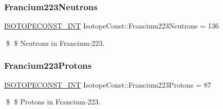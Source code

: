 \subsubsection{\texorpdfstring{Francium223\+Neutrons}{Francium223Neutrons}}
{\footnotesize\ttfamily \mbox{\hyperlink{group___isotope_const-_macros_ga5f18360b3e99483a35c32d789e62621c}{I\+S\+O\+T\+O\+P\+E\+C\+O\+N\+S\+T\+\_\+\+I\+NT}} Isotope\+Const\+::\+Francium223\+Neutrons = 136}

\$ \$ Neutrons in Francium-\/223. \mbox{\label{group___isotope_const-_francium-_fr223_gae2969e4bd4cb16bd9b59349f22cb2c62}} 
\subsubsection{\texorpdfstring{Francium223\+Protons}{Francium223Protons}}
{\footnotesize\ttfamily \mbox{\hyperlink{group___isotope_const-_macros_ga5f18360b3e99483a35c32d789e62621c}{I\+S\+O\+T\+O\+P\+E\+C\+O\+N\+S\+T\+\_\+\+I\+NT}} Isotope\+Const\+::\+Francium223\+Protons = 87}

\$ \$ Protons in Francium-\/223. 